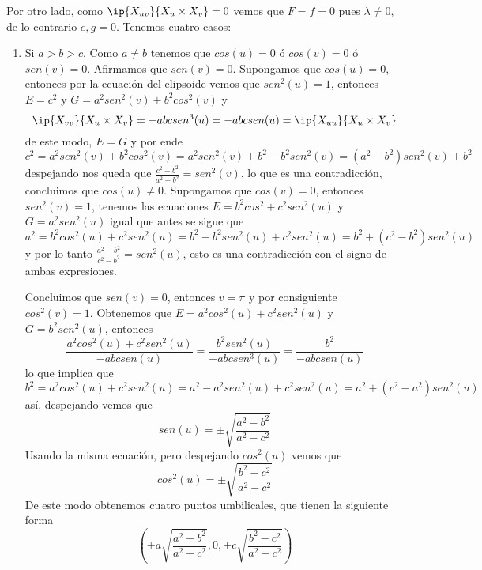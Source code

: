 \documentclass{article}
\begin{document}
Por otro lado, como $\ip{X_{uv}}{X_{u}\times X_{v}}=0$ vemos que $F=f=0$ pues $\lambda\neq0$, de
lo contrario $e,g=0$. Tenemos cuatro casos:
\begin{enumerate}
    \item Si $a>b>c$. Como $a\neq b$ tenemos que $cos(u)=0$ ó $cos(v)=0$ ó $sen(v)=0$. Afirmamos
    que $sen(v)=0$. Supongamos que $cos(u)=0$, entonces por la ecuación del elipsoide vemos que
    $sen^{2}(u)=1$, entonces $E=c^{2}$ y $G=a^{2}sen^{2}(v)+b^{2}cos^{2}(v)$ y
    \begin{equation*}
        \ip{X_{vv}}{X_{u}\times X_{v}}=-abcsen^{3}(u)=-abcsen(u)=\ip{X_{uu}}{X_{u}\times X_{v}}
    \end{equation*}
    de este modo, $E=G$ y por ende
    \begin{equation*}
        c^{2}=a^{2}sen^{2}(v)+b^{2}cos^{2}(v)=a^{2}sen^{2}(v)+b^{2}-b^{2}sen^{2}(v)
        =(a^{2}-b^{2})sen^{2}(v)+b^{2}
    \end{equation*}
    despejando nos queda que $\frac{c^{2}-b^{2}}{a^{2}-b^{2}}=sen^{2}(v)$, lo que es una 
    contradicción, concluimos que $cos(u)\neq0$. Supongamos que $cos(v)=0$, entonces 
    $sen^{2}(v)=1$, tenemos las ecuaciones $E=b^{2}cos^{2}+c^{2}sen^{2}(u)$ y $G=a^{2}sen^{2}(u)$
    igual que antes se sigue que
    \begin{equation*}
        a^{2}=b^{2}cos^{2}(u)+c^{2}sen^{2}(u)=b^{2}-b^{2}sen^{2}(u)+c^{2}sen^{2}(u)
        =b^{2}+(c^{2}-b^{2})sen^{2}(u)
    \end{equation*}
    y por lo tanto $\frac{a^{2}-b^{2}}{c^{2}-b^{2}}=sen^{2}(u)$, esto es una contradicción con el
    signo de ambas expresiones.
    
    Concluimos que $sen(v)=0$, entonces $v=\pi$ y por consiguiente $cos^{2}(v)=1$. Obtenemos que 
    $E=a^{2}cos^{2}(u)+c^{2}sen^{2}(u)$ y $G=b^{2}sen^{2}(u)$, entonces
    \begin{equation*}
        \frac{a^{2}cos^{2}(u)+c^{2}sen^{2}(u)}{-abcsen(u)}=\frac{b^{2}sen^{2}(u)}{-abcsen^{3}(u)}
        =\frac{b^{2}}{-abcsen(u)}
    \end{equation*}
    lo que implica que
    \begin{equation*}
        b^{2}=a^{2}cos^{2}(u)+c^{2}sen^{2}(u)=a^{2}-a^{2}sen^{2}(u)+c^{2}sen^{2}(u)
        =a^{2}+(c^{2}-a^{2})sen^{2}(u)
    \end{equation*}
    así, despejando vemos que
    \begin{equation*}
        sen(u)=\pm\sqrt{\frac{a^{2}-b^{2}}{a^{2}-c^{2}}}
    \end{equation*}
    Usando la misma ecuación, pero despejando $cos^{2}(u)$ vemos que
    \begin{equation*}
        cos^{2}(u)=\pm\sqrt{\frac{b^{2}-c^{2}}{a^{2}-c^{2}}}
    \end{equation*}
    De este modo obtenemos cuatro puntos umbilicales, que tienen la siguiente forma
    \begin{equation*}
        \left(\pm a\sqrt{\frac{a^{2}-b^{2}}{a^{2}-c^{2}}},0,
        \pm c\sqrt{\frac{b^{2}-c^{2}}{a^{2}-c^{2}}}\right)
    \end{equation*}


\end{enumerate}
\end{document}
